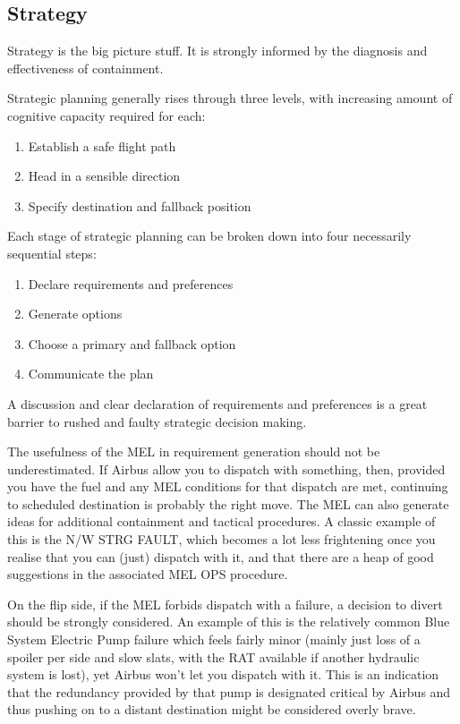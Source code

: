 \documentclass[a5paper,11pt,titlepage]{article}
\begin{document}
\subsection{Strategy}

Strategy is the big picture stuff. It is strongly informed by the
diagnosis and effectiveness of containment.

Strategic planning generally rises through three levels, with increasing
amount of cognitive capacity required for each:

\begin{enumerate}
\item Establish a safe flight path
\item Head in a sensible direction
\item Specify destination and fallback position
\end{enumerate}

Each stage of strategic planning can be broken down into four
necessarily sequential steps:

\begin{enumerate}
\item Declare requirements and preferences
\item Generate options
\item Choose a primary and fallback option
\item Communicate the plan
\end{enumerate}

A discussion and clear declaration of requirements and preferences is a
great barrier to rushed and faulty strategic decision making.

The usefulness of the MEL in requirement generation should not be
underestimated. If Airbus allow you to dispatch with something, then,
provided you have the fuel and any MEL conditions for that dispatch are
met, continuing to scheduled destination is probably the right move. The
MEL can also generate ideas for additional containment and tactical
procedures. A classic example of this is the N/W STRG FAULT, which
becomes a lot less frightening once you realise that you can (just)
dispatch with it, and that there are a heap of good suggestions in
the associated MEL OPS procedure.

On the flip side, if the MEL forbids dispatch with a failure, a decision
to divert should be strongly considered. An example of this is the
relatively common Blue System Electric Pump failure which feels fairly
minor (mainly just loss of a spoiler per side and slow slats, with the
RAT available if another hydraulic system is lost), yet Airbus won't let
you dispatch with it. This is an indication that the redundancy provided
by that pump is designated critical by Airbus and thus pushing on to
a distant destination might be considered overly brave.
\end{document}

